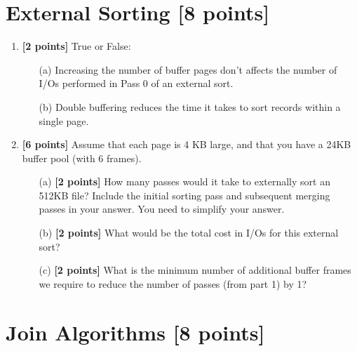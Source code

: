 \documentclass[10pt]{article}
\begin{document}
\newpage
\section{External Sorting \textbf{[8 points]}}
\begin{enumerate}
	\item \textbf{[2 points]} True or False:
	      \begin{itemize}
		      \item[(a)] Increasing the number of buffer pages don't affects the number of I/Os performed in Pass 0 of an external sort.
		      \item[(b)] Double buffering reduces the time it takes to sort records within a single page.
	      \end{itemize}

	\item \textbf{[6 points]}
	      Assume that each page is 4 KB large, and that you have a 24KB buffer pool (with 6 frames).
	      \begin{itemize}
		      \item[(a)] \textbf{[2 points]} How many passes would it take to externally sort an 512KB file?
		            Include the initial sorting pass and subsequent merging passes in your answer. You need to simplify your answer.
		      \item[(b)] \textbf{[2 points]} What would be the total cost in I/Os for this external sort?
		      \item[(c)] \textbf{[2 points]} What is the minimum number of additional buffer frames we require to reduce the number of passes
		            (from part 1) by 1? %
	      \end{itemize}
\end{enumerate}


\newpage
\section{Join Algorithms \textbf{[8 points]}}
\end{document}
